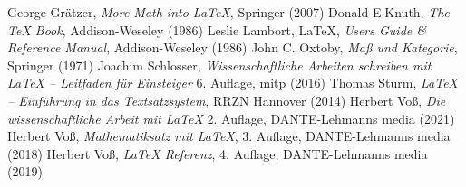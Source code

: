 \begin{thebibliography}{99}
%
 George Grätzer,  
\emph{More Math into \LaTeX{}}, Springer (2007)
%
 Donald E.Knuth,  
\emph{The \TeX{} Book}, Addison-Weseley (1986)
%
 Leslie Lambort,
{\LaTeX}, \emph{Users Guide \& Reference Manual}, Addison-Weseley (1986) 
%
 John C. Oxtoby,
\emph{Maß und Kategorie}, Springer (1971)
%
 Joachim Schlosser, 
\emph{Wissenschaftliche Arbeiten schreiben mit \LaTeX{} -- Leitfaden für Einsteiger} 6. Auflage, mitp (2016)
%
 Thomas Sturm, 
\emph{\LaTeX{} -- Einführung in das Textsatzsystem}, RRZN Hannover (2014)
%
 Herbert Voß, 
\emph{Die wissenschaftliche Arbeit mit \LaTeX{}} 2. Auflage, DANTE-Lehmanns media  (2021)
%
 Herbert Voß, 
\emph{Mathematiksatz mit \LaTeX{}}, 3. Auflage, DANTE-Lehmanns media (2018)
 Herbert Voß, 
\emph{\LaTeX{} Referenz}, 4. Auflage, DANTE-Lehmanns media  (2019)
\end{thebibliography}
